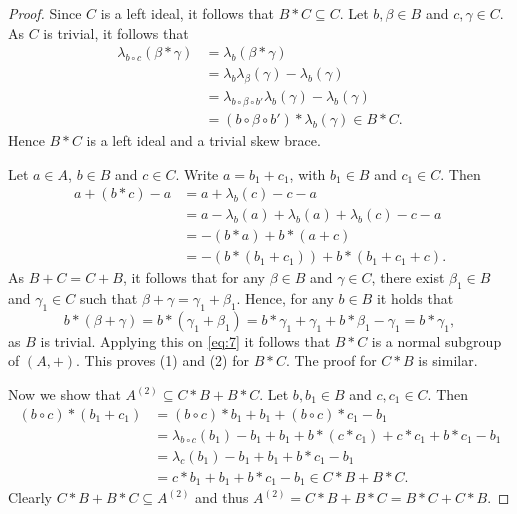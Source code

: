 \begin{proof}
Since $C$ is a left ideal, it follows that $B*C \subseteq C$. 
Let $b,\beta \in B$ and $c, \gamma \in C$. As $C$ is trivial, it follows that 
\begin{align*}
    \lambda_{b \circ c} (\beta * \gamma) & =\lambda_b(\beta * \gamma)\\
                                         & =\lambda_b \lambda_{\beta} (\gamma) - \lambda_b(\gamma)\\
                                         & =\lambda_{b \circ \beta \circ b'}\lambda_b(\gamma) -\lambda_b(\gamma)\\
                                         & =(b \circ \beta \circ b') * \lambda_b(\gamma) \in B*C. 
\end{align*}
Hence $B*C$ is a left ideal and a trivial skew brace. 

Let $a \in A$, $b \in B$ and $c \in C$. Write $a=b_1 + c_1$, with $b_1 \in B$ and $c_1 \in C$. Then
\begin{equation}\label{eq:7}
    \begin{aligned}
        a+(b*c)-a & =a + \lambda_b(c) - c - a\\
                  & =a -\lambda_b(a)+\lambda_b(a)+ \lambda_b(c) - c - a\\        
                  & =-(b*a) + b*(a+c)\\
                  & =-(b*(b_1+c_1)) + b* (b_1 + c_1+c).
    \end{aligned}
\end{equation}
As $B+C=C+B$, it follows that for any $\beta \in B$ and $\gamma \in C$, there exist $\beta_1\in B$ and $\gamma_1\in C$ such that
$\beta + \gamma = \gamma_1 + \beta_1$. Hence, for any $b \in B$ it holds that
\[
b*(\beta + \gamma)=b*(\gamma_1 + \beta_1)= b*\gamma_1 + \gamma_1 + b*\beta_1 - \gamma_1=b*\gamma_1 ,
\]
as $B$ is trivial. Applying this on \eqref{eq:7} it follows that $B*C$ is a normal subgroup of $(A,+)$.
This proves (1) and (2) for $B*C$. The proof for $C*B$ is similar.

Now we show that $A^{(2)} \subseteq C*B + B*C$. Let $b,b_1 \in B$ and $c,c_1 \in C$. Then
\begin{align*}
    (b\circ c)*(b_1+c_1) & =(b\circ c)*b_1 + b_1 + (b \circ c)*c_1 -b_1\\
                         & =\lambda_{b\circ c}(b_1) - b_1 + b_1 + b*(c*c_1) + c*c_1 + b*c_1 -b_1\\
                         & =\lambda_c(b_1) - b_1 +b_1 +b*c_1-b_1\\
                         & =c*b_1 + b_1 + b*c_1 -b_1 \in C*B+B*C.
\end{align*}
Clearly $C*B + B*C \subseteq A^{(2)}$ and thus $A^{(2)} = C*B+B*C=B*C + C*B$. 
\end{proof}


